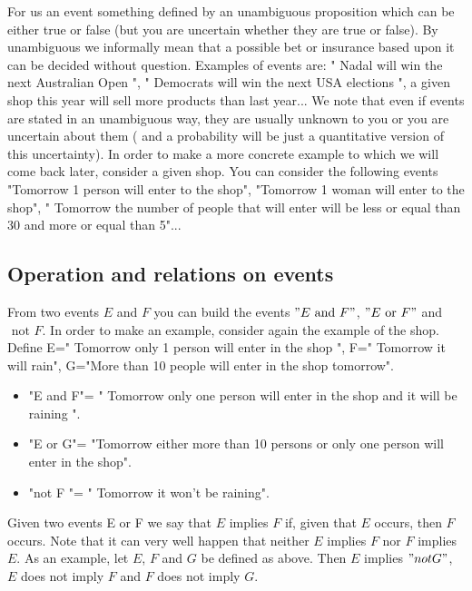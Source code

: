 \documentclass[12pt]{article}
\newcommand{\<}{{\langle \!\! \langle}}
\renewcommand{\>}{{\rangle \!\! \rangle}}
\begin{document}
For us an event something defined by an unambiguous proposition which can be either true or false (but you are uncertain whether they are true or false). By unambiguous we informally mean that a possible bet or insurance  based upon it can be decided without question. 
Examples of events are: " Nadal will win the next Australian Open ", " Democrats will win the next USA elections ", a given shop this year will sell more products than  last year... We note that even if events are stated in an unambiguous way, they are usually unknown to you or you are uncertain about them ( and a probability will be just a quantitative version of this uncertainty). 
In order to make a more concrete example to which we will come back later, consider a given shop. You can consider the following events "Tomorrow 1 person will enter to the shop", "Tomorrow 1 woman will enter to the shop", " Tomorrow the number of people that will enter will be less or equal than 30 and more or equal than 5"... 


\subsection{Operation and relations on events}

From two events $E$ and $F$ you can build the events $"E \textrm{ and }   F"$, $ "E \textrm{ or } F"$ and $ \textrm{ not } F$. In order to make an example, consider again the example of the shop. Define E=" Tomorrow only 1 person will enter in the shop ", F=" Tomorrow it will rain", G="More than 10 people will enter in the shop tomorrow". 

\begin{itemize}

	\item "E and F"= " Tomorrow only one person will enter in the shop and it will be raining ".\\
	\item "E or G"= "Tomorrow either more than 10 persons or only one person will enter in the shop".\\ 
	\item "not F "= " Tomorrow it won't be raining".\\

\end{itemize}

Given two events E or F we say that $E$ implies $F$ if, given that $E$ occurs, then $F$ occurs. Note that it can very well happen that neither $E$ implies $F$ nor $F$ implies $E$. As an example, let $E$, $F$ and $G$ be defined as above. Then $E$ implies $"not G"$, $E$ does not imply $F$ and $F$ does not imply $G$. 
\end{document}
